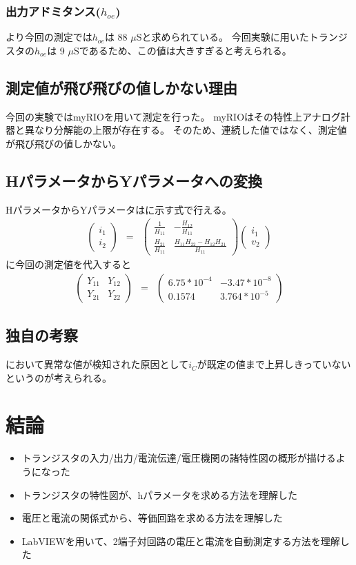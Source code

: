 \documentclass[11pt,dvipdfmx]{jarticle}
\begin{document}
		\subsubsection{出力アドミタンス($h_{oe}$)}
		より今回の測定では$h_{oe}$は $88$ $\mu$Sと求められている。
		今回実験に用いたトランジスタの$h_{oe}$は 9 $\mu$Sであるため、この値は大きすぎると考えられる。
	\subsection{測定値が飛び飛びの値しかない理由}
	今回の実験ではmyRIOを用いて測定を行った。
	myRIOはその特性上アナログ計器と異なり分解能の上限が存在する。
	そのため、連続した値ではなく、測定値が飛び飛びの値しかない。
	\subsection{HパラメータからYパラメータへの変換}
	HパラメータからYパラメータはに示す式で行える。
	\begin{eqnarray}
		\begin{pmatrix}i_1\\i_2\end{pmatrix} &=& \begin{pmatrix}\frac{1}{H_{11}}&-\frac{H_{12}}{H_{11}}\\\frac{H_{21}}{H_{11}}&\frac{H_{11}H_{22}-H_{12}H_{21}}{H_{11}}\end{pmatrix}\begin{pmatrix}i_1\\v_2\end{pmatrix}
		\label{eq:HパラメータからYパラメータへの変換}
	\end{eqnarray}
	に今回の測定値を代入すると
	\begin{eqnarray}
		\begin{pmatrix}Y_{11}&Y_{12}\\Y_{21}&Y_{22}\end{pmatrix} &=& \begin{pmatrix}6.75*10^{-4}&-3.47*10^{-8}\\0.1574&3.764*10^{-5}\end{pmatrix}
		\label{eq:HパラメータによるYパラメータ}
	\end{eqnarray}
	\subsection{独自の考察}
	において異常な値が検知された原因として$i_C$が既定の値まで上昇しきっていないというのが考えられる。
\section{結論}
\begin{itemize}
	\item トランジスタの入力/出力/電流伝達/電圧機関の諸特性図の概形が描けるようになった
	\item トランジスタの特性図が、hパラメータを求める方法を理解した
	\item 電圧と電流の関係式から、等価回路を求める方法を理解した
	\item LabVIEWを用いて、2端子対回路の電圧と電流を自動測定する方法を理解した
\end{itemize}
\begin{thebibliography}{9}
\end{thebibliography}
\end{document}
